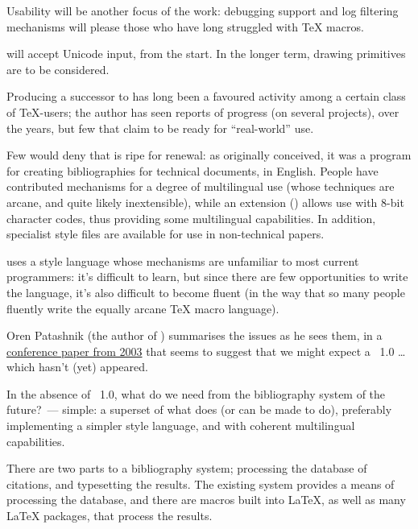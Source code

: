 Usability will be another focus of the work: debugging support and log
filtering mechanisms will please those who have long struggled with
\TeX{} macros.

\ExTeX{} will accept Unicode input, from the start.  In the longer
term, drawing primitives are to be considered.


Producing a successor to \BibTeX{} has long been a favoured activity
among a certain class of \TeX{}-users; the author has seen reports of
progress (on several projects), over the years, but few that claim to
be ready for ``real-world'' use.

Few would deny that \BibTeX{} is ripe for renewal: as originally
conceived, it was a program for creating bibliographies for technical
documents, in English.  People have contributed mechanisms for a
degree of multilingual use (whose techniques are arcane, and quite
likely inextensible), while an extension () allows
use with 8-bit character codes, thus providing some multilingual
capabilities.  In addition, specialist \BibTeX{} style files are
available for use in non-technical papers.

\BibTeX{} uses a style language whose mechanisms are unfamiliar to
most current programmers: it's difficult to learn, but since there are
few opportunities to write the language, it's also difficult to become
fluent (in the way that so many people fluently write the equally
arcane \TeX{} macro language).

Oren Patashnik (the author of \BibTeX{}) summarises the issues as he
sees them, in a %
\href{http://tug.org/TUGboat/Articles/tb24-1/patashnik.pdf}{ conference paper from 2003}
that seems to suggest that we might expect a
\BibTeX{}~1.0 \dots{} which hasn't (yet) appeared.

In the absence of \BibTeX{}~1.0, what do we need from the bibliography
system of the future?~--- simple: a superset of what \BibTeX{} does
(or can be made to do), preferably implementing a simpler style
language, and with coherent multilingual capabilities.

There are two parts to a bibliography system; processing the database
of citations, and typesetting the results.  The existing \BibTeX{}
system provides a means of processing the database, and there are
macros built into \LaTeX{}, as well as many \LaTeX{} packages, that
process the results.

